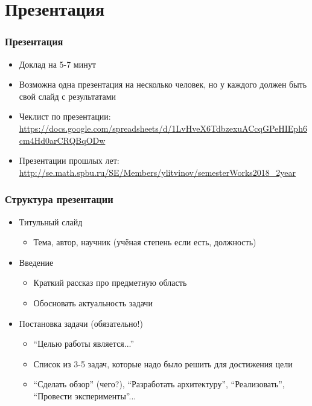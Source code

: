 \documentclass[xetex,mathserif,serif]{beamer}
\begin{document}
\section{Презентация}

	\begin{frame}
	\frametitle{Презентация}
	\begin{itemize}
		\item Доклад на 5-7 минут
		\item Возможна одна презентация на несколько человек, но у каждого должен быть свой слайд с результатами
		\item Чеклист по презентации: \url{https://docs.google.com/spreadsheets/d/1LvHveX6TdbzexuACcqGPeHIEph6cm4Hd0arCRQBqODw}
		\item Презентации прошлых лет: \url{http://se.math.spbu.ru/SE/Members/ylitvinov/semesterWorks2018_2year}
	\end{itemize}
	\end{frame}

	\begin{frame}
	\frametitle{Структура презентации}
	\begin{itemize}
		\item Титульный слайд
		      \begin{itemize}
			      \item Тема, автор, научник (учёная степень если есть, должность)
		      \end{itemize}
		\item Введение
		      \begin{itemize}
			      \item Краткий рассказ про предметную область
			      \item Обосновать актуальность задачи
		      \end{itemize}
		\item Постановка задачи (обязательно!)
		      \begin{itemize}
			      \item ``Целью работы является...''
			      \item Список из 3-5 задач, которые надо было решить для достижения цели
			      \item ``Сделать обзор'' (чего?), ``Разработать архитектуру'', ``Реализовать'', ``Провести эксперименты''...
		      \end{itemize}
	\end{itemize}
	\end{frame}
\end{document}
